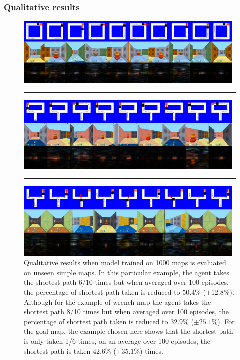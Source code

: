 \documentclass{article} %
\begin{document}
\subsubsection{Qualitative results}
\begin{figure}[h]
%
\includegraphics[width=0.98\textwidth]{./exp-results/training-1000_on_square_map.png}%
\vspace{1pt} \hrule \vspace{1pt}%
%
\includegraphics[width=0.98\textwidth]{./exp-results/training-1000_on_wrench_map.png}%
\vspace{1pt} \hrule \vspace{1pt}%
%
\includegraphics[width=0.98\textwidth]{./exp-results/training-1000_on_goal_map.png}%
\caption{Qualitative results when model trained on 1000 maps is
  evaluated on unseen simple maps.
  In this particular example, the agent takes the shortest path 6/10 times but when averaged over 100 episodes, the percentage of shortest path taken is reduced to $50.4$\% ($\pm 12.8$\%).
  Although for the example of wrench map the agent takes the shortest path 8/10 times but when averaged over 100 episodes, the percentage of shortest path taken is reduced to $32.9$\% ($\pm 25.1$\%).
 For the goal map, the example chosen here shows that the shortest path is only taken 1/6 times, on an average over 100 episodes, the shortest path is taken $42.6$\% ($\pm 35.1$\%) times.
}
\label{fig:planning-qualitative}
\end{figure}
\end{document}
